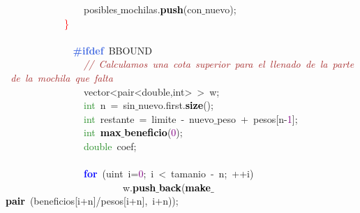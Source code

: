 \mbox{}\ \ \ \ \ \ \ \ \ \ \ \ \ \ \ \ posibles$\_$mochilas\textcolor{BrickRed}{.}\textbf{\textcolor{Black}{push}}\textcolor{BrickRed}{(}con$\_$nuevo\textcolor{BrickRed}{);} \\
\mbox{}\ \ \ \ \ \ \ \ \ \ \ \ \textcolor{Red}{\}} \\
\mbox{} \\
\mbox{}\textbf{\textcolor{RoyalBlue}{\ \ \ \ \ \ \ \ \ \ \ \ \#ifdef}}\ BBOUND \\
\mbox{}\ \ \ \ \ \ \ \ \ \ \ \ \ \ \ \ \textit{\textcolor{Brown}{//\ Calculamos\ una\ cota\ superior\ para\ el\ llenado\ de\ la\ parte\ de\ la\ mochila\ que\ falta}} \\
\mbox{}\ \ \ \ \ \ \ \ \ \ \ \ \ \ \ \ \textcolor{TealBlue}{vector\textless{}pair\textless{}double,int\textgreater{}\ \textgreater{}}\ w\textcolor{BrickRed}{;} \\
\mbox{}\ \ \ \ \ \ \ \ \ \ \ \ \ \ \ \ \textcolor{ForestGreen}{int}\ n\ \textcolor{BrickRed}{=}\ sin$\_$nuevo\textcolor{BrickRed}{.}first\textcolor{BrickRed}{.}\textbf{\textcolor{Black}{size}}\textcolor{BrickRed}{();} \\
\mbox{}\ \ \ \ \ \ \ \ \ \ \ \ \ \ \ \ \textcolor{ForestGreen}{int}\ restante\ \textcolor{BrickRed}{=}\ limite\ \textcolor{BrickRed}{-}\ nuevo$\_$peso\ \textcolor{BrickRed}{+}\ pesos\textcolor{BrickRed}{[}n\textcolor{BrickRed}{-}\textcolor{Purple}{1}\textcolor{BrickRed}{];} \\
\mbox{}\ \ \ \ \ \ \ \ \ \ \ \ \ \ \ \ \textcolor{ForestGreen}{int}\ \textbf{\textcolor{Black}{max$\_$beneficio}}\textcolor{BrickRed}{(}\textcolor{Purple}{0}\textcolor{BrickRed}{);} \\
\mbox{}\ \ \ \ \ \ \ \ \ \ \ \ \ \ \ \ \textcolor{ForestGreen}{double}\ coef\textcolor{BrickRed}{;} \\
\mbox{} \\
\mbox{}\ \ \ \ \ \ \ \ \ \ \ \ \ \ \ \ \textbf{\textcolor{Blue}{for}}\ \textcolor{BrickRed}{(}\textcolor{TealBlue}{uint}\ i\textcolor{BrickRed}{=}\textcolor{Purple}{0}\textcolor{BrickRed}{;}\ i\ \textcolor{BrickRed}{\textless{}}\ tamanio\ \textcolor{BrickRed}{-}\ n\textcolor{BrickRed}{;}\ \textcolor{BrickRed}{++}i\textcolor{BrickRed}{)} \\
\mbox{}\ \ \ \ \ \ \ \ \ \ \ \ \ \ \ \ \ \ \ \ \ \ \ \ w\textcolor{BrickRed}{.}\textbf{\textcolor{Black}{push$\_$back}}\textcolor{BrickRed}{(}\textbf{\textcolor{Black}{make$\_$pair}}\ \textcolor{BrickRed}{(}beneficios\textcolor{BrickRed}{[}i\textcolor{BrickRed}{+}n\textcolor{BrickRed}{]/}pesos\textcolor{BrickRed}{[}i\textcolor{BrickRed}{+}n\textcolor{BrickRed}{],}\ i\textcolor{BrickRed}{+}n\textcolor{BrickRed}{));} \\

